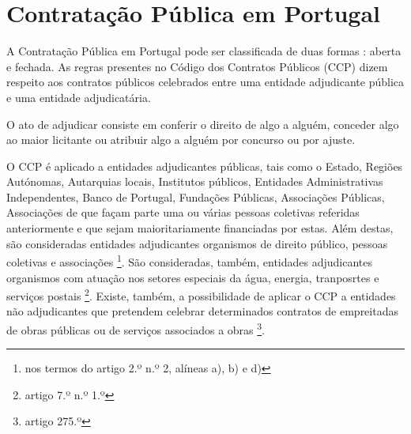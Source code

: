 \section{Contratação Pública em Portugal}


A Contratação Pública em Portugal pode ser classificada de duas formas : aberta e fechada. As regras presentes no Código dos Contratos Públicos (CCP) dizem respeito aos contratos públicos celebrados entre uma entidade adjudicante pública e uma entidade adjudicatária.


O ato de adjudicar consiste em conferir o direito de algo a alguém, conceder algo ao maior licitante ou atribuir algo a alguém por concurso ou por ajuste. 

O CCP é aplicado a entidades adjudicantes públicas, tais como o Estado, Regiões Autónomas, Autarquias locais, Institutos públicos, Entidades Administrativas Independentes, Banco de Portugal, Fundações Públicas, Associações Públicas, Associações de que façam parte uma ou várias pessoas coletivas referidas anteriormente e que sejam maioritariamente financiadas por estas. Além destas, são consideradas entidades adjudicantes organismos de direito público, pessoas coletivas e associações \footnote{nos termos do artigo 2.º n.º 2, alíneas a), b) e d)}. São consideradas, também, entidades adjudicantes organismos com atuação nos setores especiais da água, energia, tranposrtes e serviços postais \footnote{artigo 7.º n.º 1.º}. Existe, também, a possibilidade de aplicar o CCP a entidades não adjudicantes que pretendem celebrar determinados contratos de empreitadas de obras públicas ou de serviços associados a obras \footnote{artigo 275.º}.



